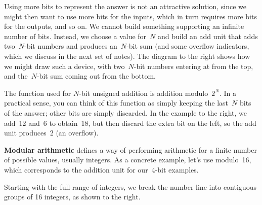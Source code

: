 \begin{minipage}{5.4in}
Using more bits to represent the answer is not an attractive solution, 
since we might then want to use more bits for the inputs, which in turn
requires more bits for the outputs, and so on.  We cannot build 
something supporting an infinite number of bits.  Instead, we 
choose a value for~$N$ and build an add unit that adds two~\mbox{$N$-bit}
numbers and produces an~\mbox{$N$-bit} sum (and some overflow 
indicators, which we discuss in the next set of notes).  The diagram
to the right shows how we might draw such a device, with two~\mbox{$N$-bit}
numbers entering at from the top, and the~\mbox{$N$-bit} sum coming out
from the bottom.
\end{minipage}\hspace{.25in}%
\begin{minipage}{0.85in}
\end{minipage}

\begin{minipage}{5.55in}
The function used for \mbox{$N$-bit} unsigned addition is addition 
modulo~$2^N$.  In a practical sense, you can think of this function
as simply keeping the last~$N$ bits of the answer; other bits 
are simply discarded.  In the example to the right,
we add~12 and~6 to obtain~18, but then discard the extra bit on the
left, so the add unit produces~2 (an overflow).
\end{minipage}\hspace{.25in}%
\begin{minipage}{0.7in}
\end{minipage}

\begin{minipage}{3.75in}
{\bf Modular arithmetic} defines a way of performing arithmetic for
a finite number of possible values, usually integers.  
As a concrete example, let's use modulo~16, which corresponds to
the addition unit for our~\mbox{4-bit} examples.\mpline

Starting with the full range of integers, we break the number
line into contiguous groups of 16 integers, as shown to the right.\linebreak
\end{minipage}\hspace{.25in}%
\begin{minipage}{2.5in}
\end{minipage}\mpdone

